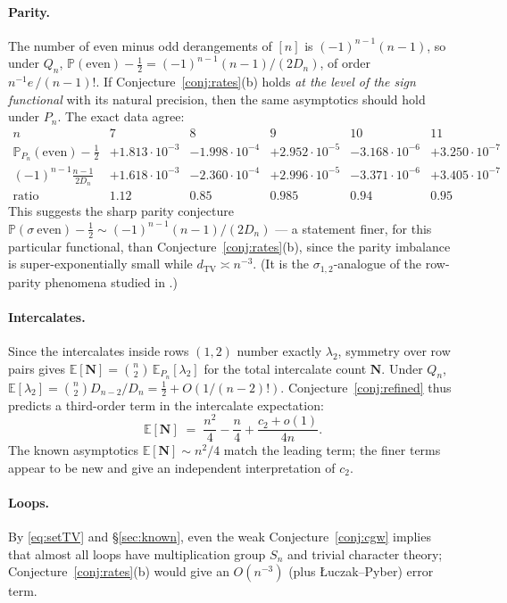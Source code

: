 \documentclass[11pt]{article}
\theoremstyle{definition}
\newcommand{\dtv}{d_{\mathrm{TV}}}
\newcommand{\E}{\mathbb{E}}
\renewcommand{\Pr}{\mathbb{P}}
\newcommand{\PP}{P}
\newcommand{\QQ}{Q}
\begin{document}
\paragraph{Parity.}  The number of even minus odd derangements of $[n]$ is
$(-1)^{n-1}(n-1)$, so under $\QQ_n$,
$\Pr(\text{even})-\tfrac12=(-1)^{n-1}(n-1)/(2D_n)$, of order $n^{-1}e\,/(n-1)!$.
If Conjecture~\ref{conj:rates}(b) holds \emph{at the level of the sign
functional} with its natural precision, then the same asymptotics should hold
under $\PP_n$.  The exact data agree:
\[
\begin{array}{l|lllll}
n & 7 & 8 & 9 & 10 & 11\\\hline
\Pr_{\PP_n}(\mathrm{even})-\tfrac12 & +1.813\cdot10^{-3} & -1.998\cdot10^{-4}
& +2.952\cdot10^{-5} & -3.168\cdot10^{-6} & +3.250\cdot10^{-7}\\
(-1)^{n-1}\frac{n-1}{2D_n} & +1.618\cdot10^{-3} & -2.360\cdot10^{-4}
& +2.996\cdot10^{-5} & -3.371\cdot10^{-6} & +3.405\cdot10^{-7}\\
\text{ratio} & 1.12 & 0.85 & 0.985 & 0.94 & 0.95
\end{array}
\]
This suggests the sharp parity conjecture
$\Pr(\sigma\ \text{even})-\tfrac12\sim(-1)^{n-1}(n-1)/(2D_n)$ --- a
statement finer, for this particular functional, than
Conjecture~\ref{conj:rates}(b), since the parity imbalance is
super-exponentially small while $\dtv\asymp n^{-3}$.  (It is the
$\sigma_{1,2}$-analogue of the row-parity phenomena studied in \cite{KPS25}.)

\paragraph{Intercalates.}  Since the intercalates inside rows $(1,2)$ number
exactly $\lambda_2$, symmetry over row pairs gives
$\E[\mathbf N]=\binom n2\,\E_{\PP_n}[\lambda_2]$ for the total intercalate
count $\mathbf N$.  Under $\QQ_n$, $\E[\lambda_2]=\binom
n2D_{n-2}/D_n=\tfrac12+O(1/(n-2)!)$.  Conjecture~\ref{conj:refined} thus
predicts a third-order term in the intercalate expectation:
\[
\E[\mathbf N]\;=\;\frac{n^2}{4}-\frac n4+\frac{c_2+o(1)}{4n}.
\]
The known asymptotics $\E[\mathbf N]\sim n^2/4$ \cite{KSSS22} match the
leading term; the finer terms appear to be new and give an independent
interpretation of $c_2$.

\paragraph{Loops.}  By \eqref{eq:setTV} and \S\ref{sec:known}, even the weak
Conjecture~\ref{conj:cgw} implies that almost all loops have multiplication
group $S_n$ and trivial character theory; Conjecture~\ref{conj:rates}(b)
would give an $O(n^{-3})$ (plus {\L}uczak--Pyber) error term.
\end{document}
